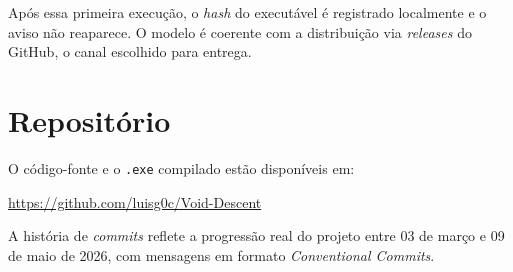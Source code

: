 Após essa primeira execução, o \emph{hash} do executável é registrado localmente e
o aviso não reaparece. O modelo é coerente com a distribuição via \emph{releases}
do GitHub, o canal escolhido para entrega.

\section{Repositório}

O código-fonte e o \texttt{.exe} compilado estão disponíveis em:

\begin{center}
  \url{https://github.com/luisg0c/Void-Descent}
\end{center}

A história de \emph{commits} reflete a progressão real do projeto entre 03 de
março e 09 de maio de 2026, com mensagens em formato \emph{Conventional Commits}.
